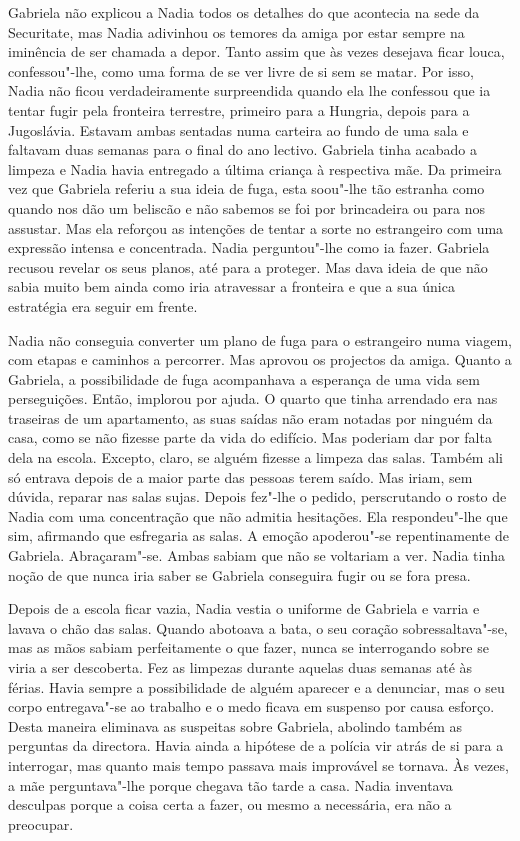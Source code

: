 Gabriela não explicou a Nadia todos os detalhes do que
acontecia na sede da Securitate, mas Nadia adivinhou os temores da amiga
por estar sempre na iminência de ser chamada a depor. Tanto assim que às
vezes desejava ficar louca, confessou"-lhe, como uma forma de se ver
livre de si sem se matar. Por isso, Nadia não ficou verdadeiramente
surpreendida quando ela lhe confessou que ia tentar fugir pela fronteira
terrestre, primeiro para a Hungria, depois para a Jugoslávia. Estavam
ambas sentadas numa carteira ao fundo de uma sala e faltavam duas
semanas para o final do ano lectivo. Gabriela tinha acabado a limpeza e
Nadia havia entregado a última criança à respectiva mãe. Da
primeira vez que Gabriela referiu a sua ideia de fuga, esta soou"-lhe tão
estranha como quando nos dão um beliscão e não sabemos se foi por
brincadeira ou para nos assustar. Mas ela reforçou as intenções de
tentar a sorte no estrangeiro com uma expressão intensa e concentrada.
Nadia perguntou"-lhe como ia fazer. Gabriela recusou revelar os seus
planos, até para a proteger. Mas dava ideia de que não sabia muito bem
ainda como iria atravessar a fronteira e que a sua única estratégia era
seguir em frente.

Nadia não conseguia converter um plano de fuga para o estrangeiro numa
viagem, com etapas e caminhos a percorrer. Mas aprovou os projectos da
amiga. Quanto a Gabriela, a possibilidade de fuga acompanhava a esperança de uma vida sem perseguições. Então, implorou por ajuda. O quarto
que tinha arrendado era nas traseiras de um apartamento, as suas saídas
não eram notadas por ninguém da casa, como se não fizesse parte da vida
do edifício. Mas poderiam dar por falta dela na escola. Excepto, claro,
se alguém fizesse a limpeza das salas. Também ali só entrava depois de
a maior parte das pessoas terem saído. Mas iriam, sem dúvida, reparar
nas salas sujas. Depois fez"-lhe o pedido, perscrutando o rosto de Nadia
com uma concentração que não admitia hesitações. Ela respondeu"-lhe que
sim, afirmando que esfregaria as salas. A emoção apoderou"-se
repentinamente de Gabriela. Abraçaram"-se. Ambas sabiam que não se
voltariam a ver. Nadia tinha noção de que nunca iria saber se Gabriela
conseguira fugir ou se fora presa.

Depois de a escola ficar vazia, Nadia vestia o uniforme
de Gabriela e varria e lavava o chão das salas. Quando
abotoava a bata, o seu coração sobressaltava"-se, mas as mãos sabiam
perfeitamente o que fazer, nunca se interrogando sobre se viria a ser
descoberta. Fez as limpezas durante aquelas duas semanas até às férias.
Havia sempre a possibilidade de alguém aparecer e a denunciar, mas o seu
corpo entregava"-se ao trabalho e o medo ficava em suspenso por causa
esforço. Desta maneira eliminava as suspeitas sobre Gabriela, abolindo
também as perguntas da directora. Havia ainda a hipótese de a polícia
vir atrás de si para a interrogar, mas quanto mais tempo passava mais
improvável se tornava. Às vezes, a mãe perguntava"-lhe porque chegava tão tarde a casa. Nadia inventava desculpas porque a
coisa certa a fazer, ou mesmo a necessária, era não a preocupar.

